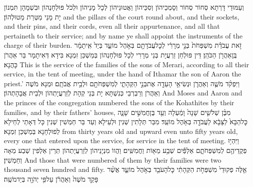{וְעַמּוּדֵי דָּרְתָא סְחוֹר סְחוֹר וְסָמְכֵיהוֹן וְסִכֵּיהוֹן וַאֲטוּנֵיהוֹן לְכָל מָנֵיהוֹן וּלְכֹל פּוּלְחָנְהוֹן וּבִשְׁמָהָן תִּמְנוֹן יָת מָנֵי מַטְּרַת מַטוּלְהוֹן׃}
{and the pillars of the court round about, and their sockets, and their pins, and their cords, even all their appurtenance, and all that pertaineth to their service; and by name ye shall appoint the instruments of the charge of their burden.}{}
{זֹ֣את עֲבֹדַ֗ת מִשְׁפְּחֹת֙ בְּנֵ֣י מְרָרִ֔י לְכׇל\maqqaf עֲבֹדָתָ֖ם בְּאֹ֣הֶל מוֹעֵ֑ד בְּיַד֙ אִֽיתָמָ֔ר בֶּֽן\maqqaf אַהֲרֹ֖ן הַכֹּהֵֽן׃}
{דֵּין פּוּלְחַן זַרְעֲיָת בְּנֵי מְרָרִי לְכָל פּוּלְחָנְהוֹן בְּמַשְׁכַּן זִמְנָא בִּידָא דְּאִיתָמָר בַּר אַהֲרֹן כָּהֲנָא׃}
{This is the service of the families of the sons of Merari, according to all their service, in the tent of meeting, under the hand of Ithamar the son of Aaron the priest.’}{}
{וַיִּפְקֹ֨ד מֹשֶׁ֧ה וְאַהֲרֹ֛ן וּנְשִׂיאֵ֥י הָעֵדָ֖ה אֶת\maqqaf בְּנֵ֣י הַקְּהָתִ֑י לְמִשְׁפְּחֹתָ֖ם וּלְבֵ֥ית אֲבֹתָֽם׃}
{וּמְנָא מֹשֶׁה וְאַהֲרֹן וְרַבְרְבֵי כְּנִשְׁתָּא יָת בְּנֵי קְהָת לְזַרְעֲיָתְהוֹן וּלְבֵית אֲבָהָתְהוֹן׃}
{And Moses and Aaron and the princes of the congregation numbered the sons of the Kohathites by their families, and by their fathers’ houses,}{}
{מִבֶּ֨ן שְׁלֹשִׁ֤ים שָׁנָה֙ וָמַ֔עְלָה וְעַ֖ד בֶּן\maqqaf חֲמִשִּׁ֣ים שָׁנָ֑ה כׇּל\maqqaf הַבָּא֙ לַצָּבָ֔א לַעֲבֹדָ֖ה בְּאֹ֥הֶל מוֹעֵֽד׃}
{מִבַּר תְּלָתִין שְׁנִין וּלְעֵילָא וְעַד בַּר חַמְשִׁין שְׁנִין כָּל דְּאָתֵי לְחֵילָא לְפוּלְחָנָא בְּמַשְׁכַּן זִמְנָא׃}
{from thirty years old and upward even unto fifty years old, every one that entered upon the service, for service in the tent of meeting.}{}
{וַיִּהְי֥וּ פְקֻדֵיהֶ֖ם לְמִשְׁפְּחֹתָ֑ם אַלְפַּ֕יִם שְׁבַ֥ע מֵא֖וֹת וַחֲמִשִּֽׁים׃}
{וַהֲווֹ מִנְיָנֵיהוֹן לְזַרְעֲיָתְהוֹן תְּרֵין אַלְפִין שְׁבַע מְאָה וְחַמְשִׁין׃}
{And those that were numbered of them by their families were two thousand seven hundred and fifty.}{}
{אֵ֤לֶּה פְקוּדֵי֙ מִשְׁפְּחֹ֣ת הַקְּהָתִ֔י כׇּל\maqqaf הָעֹבֵ֖ד בְּאֹ֣הֶל מוֹעֵ֑ד אֲשֶׁ֨ר פָּקַ֤ד מֹשֶׁה֙ וְאַהֲרֹ֔ן עַל\maqqaf פִּ֥י יְהֹוָ֖ה בְּיַד\maqqaf מֹשֶֽׁה׃ \setuma }
